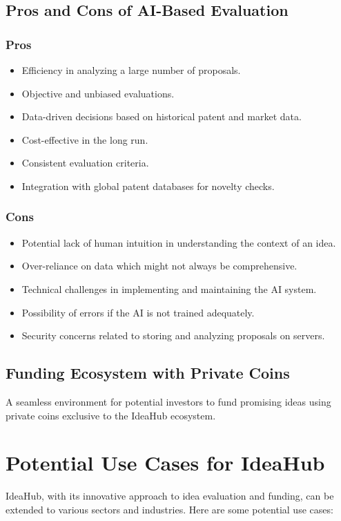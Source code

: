 \documentclass{article}
\begin{document}
	\subsection{Pros and Cons of AI-Based Evaluation}
	\subsubsection{Pros}
	\begin{itemize}
		\item Efficiency in analyzing a large number of proposals.
		\item Objective and unbiased evaluations.
		\item Data-driven decisions based on historical patent and market data.
		\item Cost-effective in the long run.
		\item Consistent evaluation criteria.
		\item Integration with global patent databases for novelty checks.
	\end{itemize}
	
	\subsubsection{Cons}
	\begin{itemize}
		\item Potential lack of human intuition in understanding the context of an idea.
		\item Over-reliance on data which might not always be comprehensive.
		\item Technical challenges in implementing and maintaining the AI system.
		\item Possibility of errors if the AI is not trained adequately.
		\item Security concerns related to storing and analyzing proposals on servers.
	\end{itemize}

	
	\subsection{Funding Ecosystem with Private Coins}
	A seamless environment for potential investors to fund promising ideas using private coins exclusive to the IdeaHub ecosystem.
		
	\section{Potential Use Cases for IdeaHub}
	IdeaHub, with its innovative approach to idea evaluation and funding, can be extended to various sectors and industries. Here are some potential use cases:
	
\end{document}
